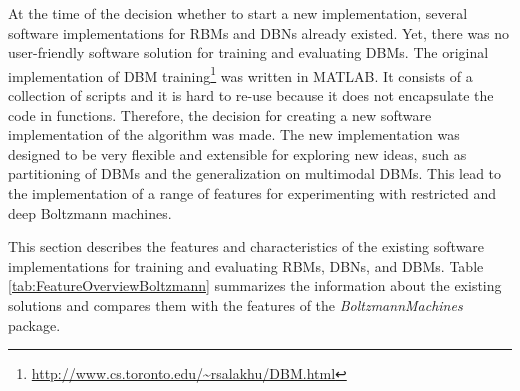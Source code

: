 \documentclass[12pt]{article}
\newcommand{\apkg}[1]{\emph{#1}}
\begin{document}
At the time of the decision whether to start a new implementation, several software implementations for RBMs and DBNs already existed.
Yet, there was no user-friendly software solution for training and evaluating DBMs.
The original implementation of DBM training\footnote{\url{http://www.cs.toronto.edu/~rsalakhu/DBM.html}} was written in MATLAB.
It consists of a collection of scripts and it is hard to re-use because it does not encapsulate the code in functions.
Therefore, the decision for creating a new software implementation of the algorithm was made.
The new implementation was designed to be very flexible and extensible for exploring new ideas, such as partitioning of DBMs and the generalization on multimodal DBMs.
This lead to the implementation of a range of features for experimenting with restricted and deep Boltzmann machines.

This section describes the features and characteristics of the existing software implementations for training and evaluating RBMs, DBNs, and DBMs.
Table \ref{tab:FeatureOverviewBoltzmann} summarizes the information about the existing solutions and compares them with the features of the \apkg{BoltzmannMachines} package.
\end{document}
